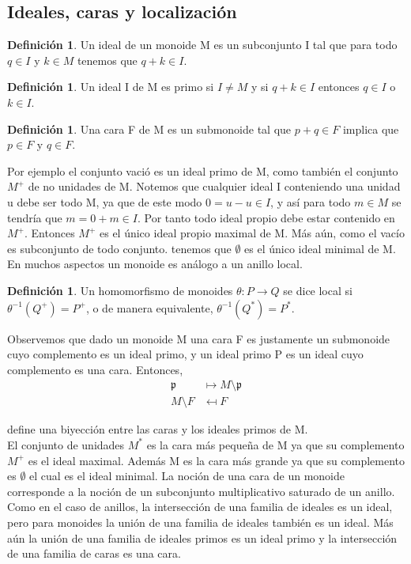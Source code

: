 \documentclass[12pt,spanish]{amsart}
\newcommand{\fk}[1]{\mathfrak{#1}}
\theoremstyle{definition}
\newtheorem{Def}[Theorem]{Definición}
\theoremstyle{remark}
\begin{document}
\subsection{Ideales, caras y localización}
\begin{Def}
Un ideal de un monoide M es un subconjunto I tal que para todo $q\in I$ y $k\in M$ tenemos que $q+k\in I$. 
\end{Def}

\begin{Def}
Un ideal I de M es primo si $I\neq M$ y si $q+k\in I$ entonces $q\in I$ o $k\in I$.  
\end{Def}

\begin{Def}
Una cara F de M es un submonoide tal que $p+q\in F$ implica que $p\in F$ y $q\in F$. 
\end{Def}

Por ejemplo el conjunto vació es un ideal primo de M, como también el conjunto $M^{+}$ de no unidades de M. Notemos que cualquier ideal I conteniendo una unidad u debe ser todo M, ya que de este modo $0=u-u \in I$, y así para todo $m\in M$ se tendría que $m=0+m\in I$. Por tanto todo ideal propio debe estar contenido en $M^{+}$. Entonces $M^{+}$ es el único ideal propio maximal de M. Más aún, como el vacío es subconjunto de todo conjunto. tenemos que $\emptyset$ es el único ideal minimal de M. En muchos aspectos un monoide es análogo a un anillo local. 

\begin{Def}
Un homomorfismo de monoides $\theta:P \to Q$ se dice local si $\theta^{-1}(Q^{+})=P^{+}$, o de manera equivalente, $\theta^{-1}(Q^{\ast})=P^{\ast}$. 
\end{Def}

Observemos que dado un monoide M una cara F es justamente un submonoide cuyo complemento es un ideal primo, y un ideal primo P es un ideal cuyo complemento es una cara. Entonces, 
\begin{equation*}
\begin{split}
\fk{p} &\mapsto M\setminus \fk{p} \\
M\setminus F &\mapsfrom F
\end{split}
\end{equation*}

define una biyección entre las caras y los ideales primos de M. \\
El conjunto de unidades $M^{\ast}$ es la cara más pequeña de M ya que su complemento $M^{+}$ es el ideal maximal. Además M es la cara más grande ya que su complemento es $\emptyset$ el cual es el ideal minimal.  La noción de una cara de un monoide corresponde a la noción de un subconjunto multiplicativo saturado de un anillo. \\
Como en el caso de anillos, la intersección de una familia de ideales es un ideal, pero para monoides la unión de una familia de ideales también es un ideal.  Más aún la unión de una familia de ideales primos es un ideal primo y la intersección de una familia de caras es una cara. 
\end{document}
